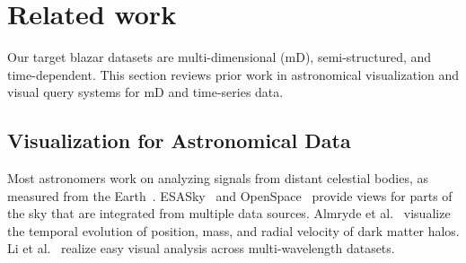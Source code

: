 \section{Related work\label{sec:relatedWork}}
Our target blazar datasets are multi-dimensional (mD), semi-structured, and time-dependent.
This section reviews prior work in astronomical visualization and visual query systems for mD and time-series data. 


\subsection{Visualization for Astronomical Data}\label{sec:relatedAstronomy}
Most astronomers work on analyzing signals from distant celestial bodies, as measured from the Earth~\cite{Kent2017}. 
ESASky~\cite{Baines2017} and OpenSpace~\cite{Bock2020} provide views for parts of the sky that are integrated from multiple data sources.
Almryde et al.~\cite{Almryde2016} visualize the temporal evolution of position, mass, and radial velocity of dark matter halos. 
Li et al.~\cite{Li2008} realize easy visual analysis across multi-wavelength datasets.
